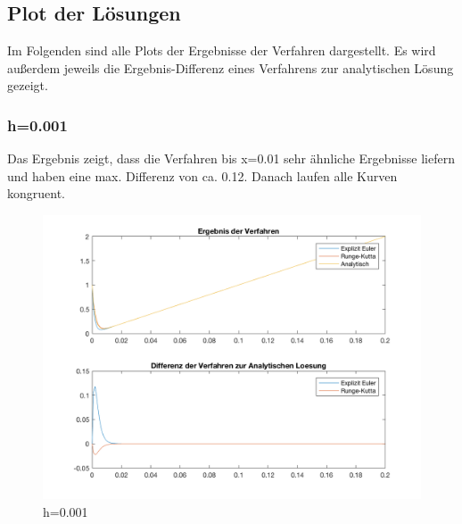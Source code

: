 \documentclass[]{scrartcl}
\begin{document}
\subsection{Plot der Lösungen}
Im Folgenden sind alle Plots der Ergebnisse der Verfahren dargestellt. Es wird außerdem jeweils die Ergebnis-Differenz eines Verfahrens zur analytischen Lösung gezeigt.
\subsubsection{h=0.001}
Das Ergebnis zeigt, dass die Verfahren bis x=0.01 sehr ähnliche Ergebnisse liefern und haben eine max. Differenz von ca. 0.12. Danach laufen alle Kurven kongruent.
\begin{figure}[htbp]
\centering
\includegraphics[width=1\linewidth]{a1_1_1}
\caption{h=0.001}
\label{fig:a1_1_1}
\end{figure}
\end{document}
